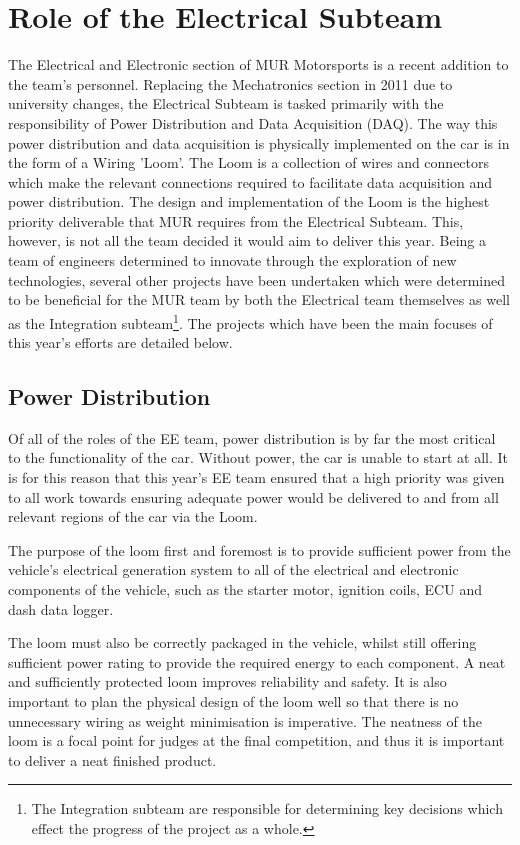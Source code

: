 
\chapter{Role of the Electrical Subteam}
The Electrical and Electronic section of MUR Motorsports is a recent addition to the team's personnel. Replacing the Mechatronics section in 2011 due to university changes, the Electrical Subteam is tasked primarily with the responsibility of Power Distribution and Data Acquisition (DAQ). The way this power distribution and data acquisition is physically implemented on the car is in the form of a Wiring 'Loom'. The Loom is a collection of wires and connectors which make the relevant connections required to facilitate data acquisition and power distribution. The design and implementation of the Loom is the highest priority deliverable that MUR requires from the Electrical Subteam. This, however, is not all the team decided it would aim to deliver this year. Being a team of engineers determined to innovate through the exploration of new technologies, several other projects have been undertaken which were determined to be beneficial for the MUR team by both the Electrical team themselves as well as the Integration subteam\footnote{The Integration subteam are responsible for determining key decisions which effect the progress of the project as a whole.}. The projects which have been the main focuses of this year's efforts are detailed below.

\section{Power Distribution}
Of all of the roles of the EE team, power distribution is by far the most critical to the functionality of the car. Without power, the car is unable to start at all. It is for this reason that this year's EE team ensured that a high priority was given to all work towards ensuring adequate power would be delivered to and from all relevant regions of the car via the Loom.

The purpose of the loom first and foremost is to provide sufficient power from the vehicle's electrical generation system to all of the electrical and electronic components of the vehicle, such as the starter motor, ignition coils, ECU and dash data logger.  

The loom must also be correctly packaged in the vehicle, whilst still offering sufficient power rating to provide the required energy to each component. A neat and sufficiently protected loom improves reliability and safety. It is also important to plan the physical design of the loom well so that there is no unnecessary wiring as weight minimisation is imperative. The neatness of the loom is a focal point for judges at the final competition, and thus it is important to deliver a neat finished product.


